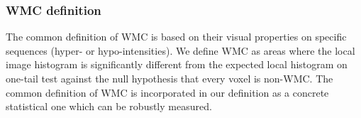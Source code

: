 \subsubsection{WMC definition}
The common definition of WMC is based on their visual properties on specific sequences (hyper- or hypo-intensities). We define WMC as areas where the local image histogram is significantly different from the expected local histogram on one-tail test against the null hypothesis that every voxel is non-WMC. The common definition of WMC is incorporated in our definition as a concrete statistical one which can be robustly measured.

    
